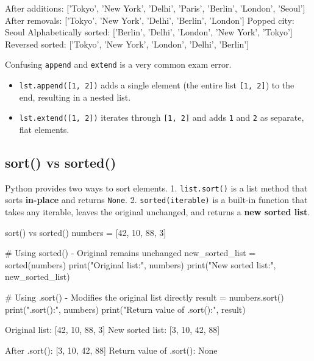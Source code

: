 \begin{outputbox}
After additions: ['Tokyo', 'New York', 'Delhi', 'Paris', 'Berlin', 'London', 'Seoul']
After removals: ['Tokyo', 'New York', 'Delhi', 'Berlin', 'London']
Popped city: Seoul
Alphabetically sorted: ['Berlin', 'Delhi', 'London', 'New York', 'Tokyo']
Reversed sorted: ['Tokyo', 'New York', 'London', 'Delhi', 'Berlin']
\end{outputbox}

\begin{commonmistake}
\examBadge{} Confusing \texttt{append} and \texttt{extend} is a very common exam error. 
\begin{itemize}
    \item \texttt{lst.append([1, 2])} adds a single element (the entire list \texttt{[1, 2]}) to the end, resulting in a nested list.
    \item \texttt{lst.extend([1, 2])} iterates through \texttt{[1, 2]} and adds \texttt{1} and \texttt{2} as separate, flat elements.
\end{itemize}
\end{commonmistake}

\subsection{sort() vs sorted()}

Python provides two ways to sort elements. 
1. \texttt{list.sort()} is a list method that sorts \textbf{in-place} and returns \texttt{None}.
2. \texttt{sorted(iterable)} is a built-in function that takes any iterable, leaves the original unchanged, and returns a \textbf{new sorted list}.

\begin{pythoncode}[]{sort() vs sorted()}
numbers = [42, 10, 88, 3]

# Using sorted() - Original remains unchanged
new_sorted_list = sorted(numbers)
print("Original list:", numbers)
print("New sorted list:", new_sorted_list)

# Using .sort() - Modifies the original list directly
result = numbers.sort()
print("\nAfter .sort():", numbers)
print("Return value of .sort():", result)
\end{pythoncode}

\begin{outputbox}
Original list: [42, 10, 88, 3]
New sorted list: [3, 10, 42, 88]

After .sort(): [3, 10, 42, 88]
Return value of .sort(): None
\end{outputbox}

